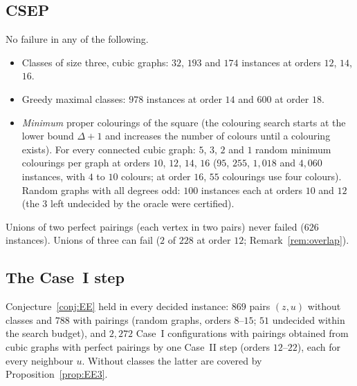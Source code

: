 \documentclass[11pt]{amsart}
\theoremstyle{definition}
\begin{document}
\subsection*{CSEP}
No failure in any of the following.
\begin{itemize}
\item Classes of size three, cubic graphs: $32$, $193$ and $174$ instances at orders $12$, $14$, $16$.
\item Greedy maximal classes: $978$ instances at order $14$ and $600$ at order $18$.
\item \emph{Minimum} proper colourings of the square (the colouring search starts at the lower bound
$\Delta+1$ and increases the number of colours until a colouring exists). For every connected cubic graph:
$5$, $3$, $2$ and $1$ random minimum colourings per graph at orders $10$, $12$, $14$, $16$ ($95$, $255$,
$1{,}018$ and $4{,}060$ instances, with $4$ to $10$ colours; at order $16$, $55$ colourings use four
colours). Random graphs with all degrees odd: $100$ instances each at orders $10$ and $12$ (the $3$
left undecided by the oracle were certified).
\end{itemize}
Unions of two perfect pairings (each vertex in two pairs) never failed ($626$ instances). Unions of three
can fail ($2$ of $228$ at order $12$; Remark~\ref{rem:overlap}).

\subsection*{The Case~I step}
Conjecture~\ref{conj:EE} held in every decided instance: $869$ pairs $(z,u)$ without classes and $788$
with pairings (random graphs, orders $8$--$15$; $51$ undecided within the search budget), and $2{,}272$
Case~I configurations with pairings obtained from cubic graphs with perfect pairings by one Case~II step
(orders $12$--$22$), each for every neighbour $u$. Without classes the latter are covered by
Proposition~\ref{prop:EE3}.
\end{document}
